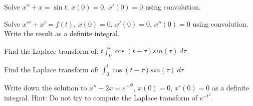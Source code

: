 \begin{exercise}
	Solve $x''+x = \sin t$, $x(0) = 0$, $x'(0)=0$ using convolution.
\end{exercise}

\begin{exercise}
	Solve $x'''+x' = f(t)$, $x(0) = 0$, $x'(0)=0$, $x''(0)=0$ using convolution.
	Write the result as a definite integral.
\end{exercise}

\begin{exercise}
	Find the Laplace transform of: $t\int_0^t \cos(t-\tau) sin(\tau) ~ d\tau$
\end{exercise}

\begin{exercise}
	Find the Laplace transform of: $\int_0^t \cos(t-\tau) sin(\tau) ~ d\tau$
\end{exercise}

\begin{exercise}
	Write down the solution to
	$x''-2x=e^{-t^2}$, $x(0)=0$, $x'(0)=0$ as a
	definite integral.  Hint: Do not try to compute the
	Laplace transform of $e^{-t^2}$.
\end{exercise}

